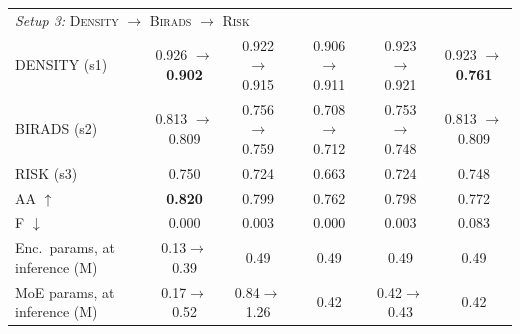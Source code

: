 \begin{table}[t]
\begin{tabular}{lccccc}
\midrule
\multicolumn{6}{l}{\emph{Setup 3:} \textsc{Density} $\to$ \textsc{Birads} $\to$ \textsc{Risk}} \\
\addlinespace[1pt]
DENSITY (s1) & 0.926 $\to$ \textbf{0.902} & 0.922 $\to$ 0.915 & 0.906 $\to$ 0.911 & 0.923 $\to$ 0.921 & 0.923 $\to$ \textbf{0.761} \\
BIRADS (s2) & 0.813 $\to$ 0.809 & 0.756 $\to$ 0.759 & 0.708 $\to$ 0.712 & 0.753 $\to$ 0.748 & 0.813 $\to$ 0.809 \\
RISK (s3) & 0.750 & 0.724 & 0.663 & 0.724 & 0.748 \\
\addlinespace[1pt]
AA $\uparrow$ & \textbf{0.820} & 0.799 & 0.762 & 0.798 & 0.772 \\
F $\downarrow$ & 0.000 & 0.003 & 0.000 & 0.003 & 0.083 \\
Enc.\ params, at inference (M) & 0.13$\to$0.39 & 0.49 & 0.49 & 0.49 & 0.49 \\
MoE params, at inference (M) & 0.17$\to$0.52 & 0.84$\to$1.26 & 0.42 & 0.42$\to$0.43 & 0.42 \\
\bottomrule
\end{tabular}
\end{table}
